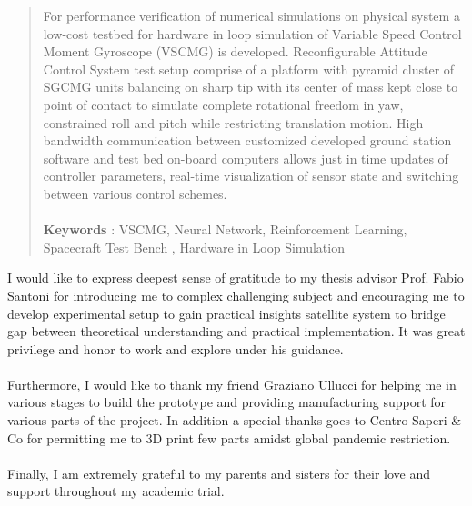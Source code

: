 \documentclass[english,oneside,LaM,binding=0.6cm]{sapthesis}
\begin{document}
\begin{abstract}
For performance verification of numerical simulations on physical system a low-cost testbed for hardware in loop simulation of Variable Speed Control Moment Gyroscope (VSCMG) is developed. Reconfigurable Attitude Control System test setup comprise of a platform with pyramid cluster of SGCMG units balancing on sharp tip with its center of mass kept close to point of contact to simulate complete rotational freedom in yaw, constrained roll and pitch while restricting translation motion. High bandwidth communication between customized developed ground station software and test bed on-board computers allows just in time updates of controller parameters, real-time visualization of sensor state and switching between various control schemes.
\\
\\
\textbf{Keywords} : VSCMG, Neural Network, Reinforcement Learning, Spacecraft Test Bench , Hardware in Loop Simulation

\end{abstract}

\begin{acknowledgments}
{}
I would like to express deepest sense of gratitude to my thesis advisor Prof. Fabio Santoni for introducing me to complex challenging subject and encouraging me to develop experimental setup to gain practical insights satellite system to bridge gap between theoretical understanding and practical implementation. It was great privilege and honor to work and explore under his guidance. \\
\\
Furthermore, I would like to thank my friend Graziano Ullucci for helping me in various stages to build the prototype and providing manufacturing support for various parts of the project. In addition a special thanks goes to Centro Saperi & Co for permitting me to 3D print few parts amidst global pandemic restriction. \\
\\
Finally, I am extremely grateful to my parents and sisters for their love and support throughout my academic trial.

\end{acknowledgments}


\renewcommand{\contentsname}{Table of Contents}
\tableofcontents

\listoftables

\listoffigures
\end{document}
